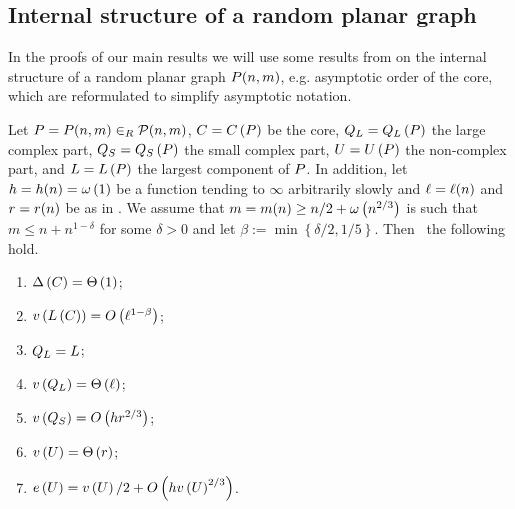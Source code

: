 \subsection{Internal structure of a random planar graph}\label{MDsub:internal_structure}
In the proofs of our main results we will use some results from \cite{KangLuczak2012,KangMosshammerSpruessel2020} on the internal structure of a random planar graph $P(n,m)$, e.g. asymptotic order of the core, which are reformulated to simplify asymptotic notation. 
\begin{thm}\label{MDthm:internal_structure}
	Let $P=P(n,m)\in_R \mathcal{P}(n,m)$, $C=C\left(P\right)$ be the core, $Q_L=Q_L\left(P\right)$ the large complex part, $Q_S=Q_S\left(P\right)$ the small complex part, $U=U\left(P\right)$ the non-complex part, and $L=L\left(P\right)$ the largest component of $P$. In addition, let $h=h(n)=\omega\left(1\right)$ be a function tending to $\infty$ arbitrarily slowly and $\ell=\ell(n)$ and $r=r(n)$ be as in . We assume that $m=m(n)\geq n/2+\omega\left(n^{2/3}\right)$ is such that $m\leq n+n^{1-\delta}$ for some $\delta>0$ and let $\beta:=\min\left\{\delta/2,1/5\right\}$. Then \whp\ the following hold.
\begin{enumerate}
\item\label{MDthm:internal_structure1}
$\Delta\left(C\right)=\Theta\left(1\right)$;
\item\label{MDthm:internal_structure2}
$v\left({L\left(C\right)}\right)=O\left(\ell^{1-\beta}\right)$;
\item\label{MDthm:internal_structure3}
$Q_L=L$;
\item\label{MDthm:internal_structure4}
$v\left({Q_L}\right)=\Theta\left(\ell\right)$;
\item\label{MDthm:internal_structure5}
$v\left({Q_S}\right)=O\left(hr^{2/3}\right)$;
\item\label{MDthm:internal_structure6}
$v\left({U}\right)=\Theta\left(r\right)$;
\item\label{MDthm:internal_structure7}
$e\left({U}\right)=v\left({U}\right)/2+O\left(hv\left({U}\right)^{2/3}\right)$.
\end{enumerate}	
\end{thm}

